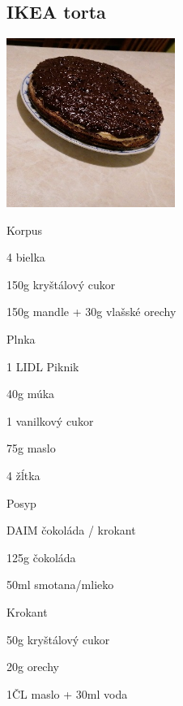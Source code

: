 \setcounter{step}{0}
\subsection{IKEA torta}

\begin{ingredient}
\includegraphics[height=5.5cm]{images/daim}
\def\portions{4}%

\begin{main}
\item
\end{main}
\begin{subingredient}{Korpus}
	\item 4 bielka
	\item 150g kryštálový cukor
	\item 150g mandle + 30g vlašské orechy
\end{subingredient}
\begin{subingredient}{Plnka}
	\item 1 LIDL Piknik
	\item 40g múka
	\item 1 vanilkový cukor
	\item 75g maslo
	\item 4 žĺtka
\end{subingredient}
\begin{subingredient}{Posyp}
	\item DAIM čokoláda / krokant
	\item 125g čokoláda
	\item 50ml smotana/mlieko
\end{subingredient}
\begin{subingredient}{Krokant}
	\item 50g kryštálový cukor
	\item 20g orechy
	\item 1ČL maslo + 30ml voda
\end{subingredient}
\end{ingredient}

